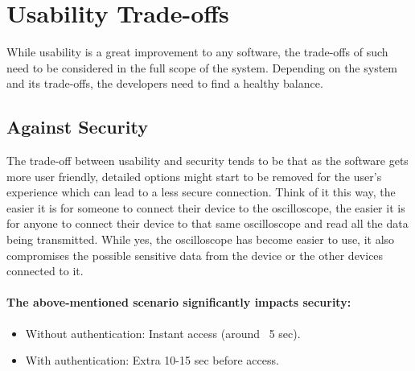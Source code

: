\section{Usability Trade-offs}
While usability is a great improvement to any software, the trade-offs of such need to be considered in the full scope of the system. Depending on the system and its trade-offs, the developers need to find a healthy balance.

\subsection{Against Security}
The trade-off between usability and security tends to be that as the software gets more user friendly, detailed options might start to be removed for the user's experience which can lead to a less secure connection. Think of it this way, the easier it is for someone to connect their device to the oscilloscope, the easier it is for anyone to connect their device to that same oscilloscope and read all the data being transmitted. While yes, the oscilloscope has become easier to use, it also compromises the possible sensitive data from the device or the other devices connected to it. 
\paragraph{\textbf{The above-mentioned scenario significantly impacts security:}}
\begin{itemize}
    \item Without authentication: Instant access (around ~5 sec).
    \item With authentication: Extra 10-15 sec before access.
\end{itemize}

\begin{table}[htbp]
\centering
\caption{Usability, Security, and Access Time Comparison}
\label{tab:security_usability}
\end{table}

